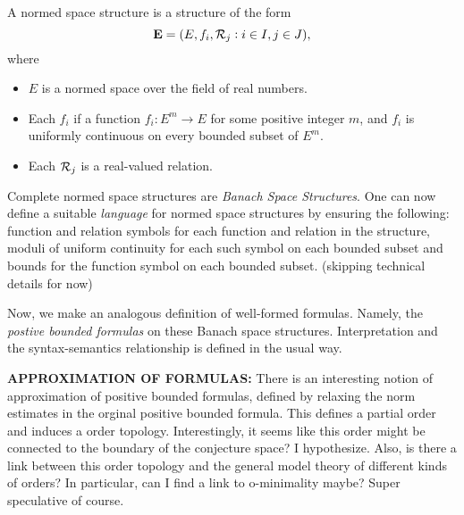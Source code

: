 \begin{definition}
\begin{definition}
    A normed space structure is a structure of the form
    \begin{equation*}
        \mathbf{E} = (E, f_i, \mathcal{R}_j : i\in I, j\in J),
    \end{equation*}
    where
    \begin{itemize}
        \item $E$ is a normed space over the field of real numbers.
        \item Each $f_i$ if a function $f_i : E^m\rightarrow E$ for some positive integer $m$, and $f_i$ is uniformly continuous on every bounded subset of $E^m$.
        \item Each $\mathcal{R}_j$ is a real-valued relation.
    \end{itemize}
\end{definition}

Complete normed space structures are \textit{Banach Space Structures}. One can now define a suitable \textit{language} for normed space structures by
ensuring the following: function and relation symbols for each function and relation in the structure, moduli of uniform continuity for each such symbol on each bounded subset
and bounds for the function symbol on each bounded subset. (skipping technical details for now)


Now, we make an analogous definition of well-formed formulas. Namely, the \textit{postive bounded formulas} on these Banach space structures. Interpretation and the syntax-semantics
relationship is defined in the usual way.

\begin{remark}
    \textbf{APPROXIMATION OF FORMULAS: } There is an interesting notion of approximation of positive bounded formulas, defined by relaxing the norm estimates in the orginal positive bounded formula.
    This defines a partial order and induces a order topology. Interestingly, it seems like this order might be connected to the boundary of the conjecture space? I hypothesize. Also, is there a link between this order topology
    and the general model theory of different kinds of orders? In particular, can I find a link to o-minimality maybe? Super speculative of course.
\end{remark}


\end{definition}
